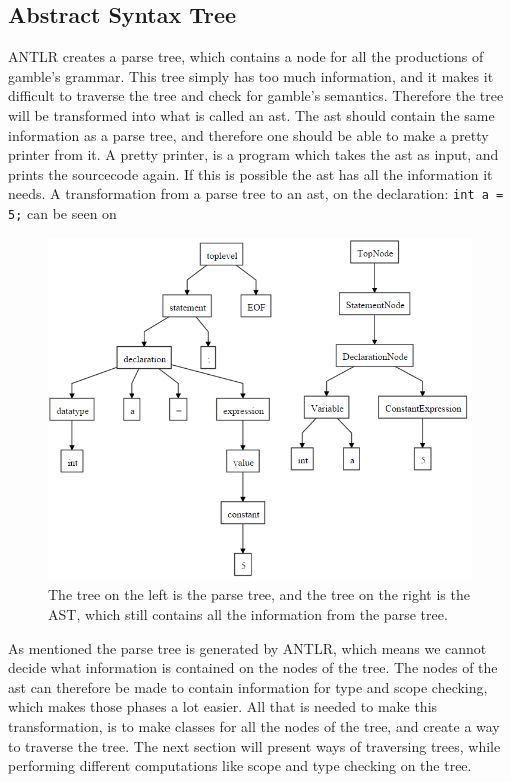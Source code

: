 \subsection*{Abstract Syntax Tree}
ANTLR creates a parse tree, which contains a node for all the productions of \gls{gamble}'s grammar.
This tree simply has too much information, and it makes it difficult to traverse the tree and check for \gls{gamble}'s semantics.
Therefore the tree will be transformed into what is called an \acrfull{ast}.
The \acrfull{ast} should contain the same information as a parse tree, and therefore one should be able to make a pretty printer from it.
A pretty printer, is a program which takes the \acrfull{ast} as input, and prints the sourcecode again.
If this is possible the \acrfull{ast} has all the information it needs.
A transformation from a parse tree to an \acrfull{ast}, on the declaration: \texttt{int a = 5;} can be seen on 

\begin{figure}
		\centering
	 	\includegraphics[width=0.8\linewidth]{figures/Trees/AST.PNG}
		\caption{The tree on the left is the parse tree, and the tree on the right is the AST, which still contains all the information from the parse tree.} \label{image:AST}
\end{figure}

As mentioned the parse tree is generated by ANTLR, which means we cannot decide what information is contained on the nodes of the tree.
The nodes of the \acrfull{ast} can therefore be made to contain information for type and scope checking, which makes those phases a lot easier.
All that is needed to make this transformation, is to make classes for all the nodes of the tree, and create a way to traverse the tree.
The next section will present ways of traversing trees, while performing different computations like scope and type checking on the tree.


